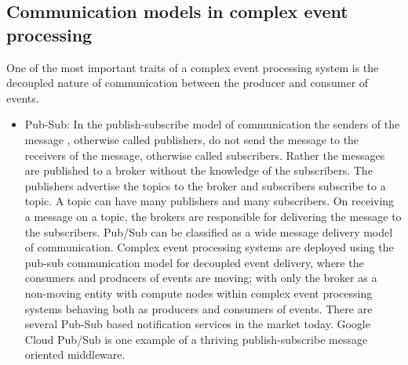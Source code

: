 \subsection{Communication models in complex event processing}
One of the most important traits of a complex event processing system is the decoupled nature of communication between the producer and consumer of events. 
\begin{itemize}
	\item Pub-Sub: In the publish-subscribe model of communication the senders of the message , otherwise called publishers, do not send the message to the receivers of the message, otherwise called subscribers. Rather the messages are published to a broker without the knowledge of the subscribers. The publishers advertise the topics to the broker and subscribers subscribe to a topic. A topic can have many publishers and many subscribers. On receiving a message on a topic, the brokers are responsible for delivering the message to the subscribers. Pub/Sub can be classified as a wide message delivery model of communication. Complex event processing systems are deployed using the pub-sub communication model for decoupled event delivery, where the consumers and producers of events are moving; with only the broker as a non-moving entity with  compute nodes within complex event processing systems  behaving both as producers and consumers of events. There are several Pub-Sub based notification services in the market today. Google Cloud Pub/Sub \cite{Krishnan2015} is one example of a thriving publish-subscribe message oriented middleware.
	

\end{itemize}
